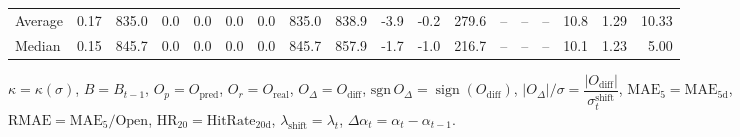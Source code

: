 \begin{threeparttable}
{\begin{tabular}{lrrrrrrrrrrrrrrrrr}
Average &     0.17 & 835.0 &               0.0 &               0.0 &                0.0 &                0.0 & 835.0 & 838.9 &       -3.9 &                     -0.2 &               279.6 &         -- &        -- &             -- &             10.8 &            1.29 &                  10.33 \\
 Median &     0.15 & 845.7 &               0.0 &               0.0 &                0.0 &                0.0 & 845.7 & 857.9 &       -1.7 &                     -1.0 &               216.7 &         -- &        -- &             -- &             10.1 &            1.23 &                   5.00 \\
\bottomrule
\end{tabular}
}
\begin{tablenotes}\footnotesize
\item $\kappa=\kappa(\sigma)$, $B=B_{t-1}$, $O_p=O_{\text{pred}}$, $O_r=O_{\text{real}}$, $O_\Delta=O_{\text{diff}}$, $\mathrm{sgn}\,O_\Delta=\operatorname{sign}(O_{\text{diff}})$, $|O_\Delta|/\sigma=\dfrac{|O_{\text{diff}}|}{\sigma_t^{\text{shift}}}$, $\mathrm{MAE}_5=\mathrm{MAE}_{5\text{d}}$, $\mathrm{RMAE}= \mathrm{MAE}_5 / \text{Open}$, $\mathrm{HR}_{20}=\mathrm{HitRate}_{20\text{d}}$, 
$\lambda_{\text{shift}}=\lambda_t$, 
$\Delta\alpha_t=\alpha_t-\alpha_{t-1}$.
\end{tablenotes}
\end{threeparttable}
\endgroup

